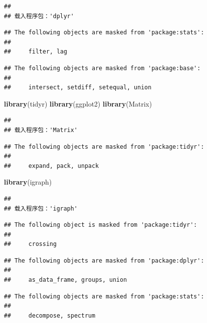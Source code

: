 \documentclass[
]{article}
\newenvironment{Shaded}{\begin{snugshade}}{\end{snugshade}}
\newcommand{\FunctionTok}[1]{\textcolor[rgb]{0.13,0.29,0.53}{\textbf{#1}}}
\newcommand{\NormalTok}[1]{#1}
\begin{document}
\begin{verbatim}
## 
## 载入程序包：'dplyr'
\end{verbatim}

\begin{verbatim}
## The following objects are masked from 'package:stats':
## 
##     filter, lag
\end{verbatim}

\begin{verbatim}
## The following objects are masked from 'package:base':
## 
##     intersect, setdiff, setequal, union
\end{verbatim}

\begin{Shaded}
\begin{Highlighting}[]
\FunctionTok{library}\NormalTok{(tidyr)}
\FunctionTok{library}\NormalTok{(ggplot2)}
\FunctionTok{library}\NormalTok{(Matrix)}
\end{Highlighting}
\end{Shaded}

\begin{verbatim}
## 
## 载入程序包：'Matrix'
\end{verbatim}

\begin{verbatim}
## The following objects are masked from 'package:tidyr':
## 
##     expand, pack, unpack
\end{verbatim}

\begin{Shaded}
\begin{Highlighting}[]
\FunctionTok{library}\NormalTok{(igraph)}
\end{Highlighting}
\end{Shaded}

\begin{verbatim}
## 
## 载入程序包：'igraph'
\end{verbatim}

\begin{verbatim}
## The following object is masked from 'package:tidyr':
## 
##     crossing
\end{verbatim}

\begin{verbatim}
## The following objects are masked from 'package:dplyr':
## 
##     as_data_frame, groups, union
\end{verbatim}

\begin{verbatim}
## The following objects are masked from 'package:stats':
## 
##     decompose, spectrum
\end{verbatim}
\end{document}
